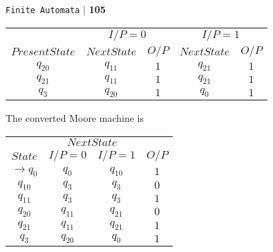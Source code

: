 \documentclass{article}
\begin{document}
\begin{flushright}
 \texttt{Finite Automata} \hspace*{0.1cm}\textbf{$|$} \hspace*{0.1cm} \textbf{105}\hspace*{0.1cm}
\end{flushright}
\vspace*{0.5cm}

\begin{center}
\begin{tabular}{ccccc}
 \hline

 \hline

 \hline

 \hline
 &  \multicolumn{2}{c}{$I/P = 0$ } &  \multicolumn{2}{c}{$I/P = 1$}  \\
  \cline{2-3}                         \cline{4-5}
 $Present State$ &   $Next State$  & $O/P$ &  $Next State$  & $O/P$\\
\hline
$q_20$             &  $q_11$  &  $1$  &  $q_21$  & $1$ \\
$q_21$             &  $q_11$  &  $1$  &  $q_21$  & $1$ \\
$q_3$             &  $q_20$  &  $1$  &  $q_0$  & $1$ \\

 \hline

 \hline

 \hline

 \hline
\end{tabular}
\end{center}

\vspace*{0.1cm}
The converted Moore machine is\\
\vspace*{0.1cm}

\begin{center}
\begin{tabular}{cccc}
 \hline

 \hline

 \hline

 \hline
 & \multicolumn{2}{c}{$Next State$}\\
 \cline{2-3}
 $State$ &  $I/P=0$ & $I/P=1$  &  $O/P$\\
\hline
$\rightarrow q_0$  &    $q_0$   &  $q_10$   &  $1$ \\
$q_10$              &    $q_3$   &  $q_3$   &  $0$ \\
$q_11$              &    $q_3$   &  $q_3$   &  $1$ \\
$q_20$              &    $q_11$   &  $q_21$   &  $0$ \\
$q_21$              &    $q_11$   &  $q_21$   &  $1$ \\
$q_3$              &    $q_20$   &  $q_0$   &  $1$ \\
 \hline

 \hline

 \hline

 \hline
\end{tabular}
\end{center}
\end{document}
